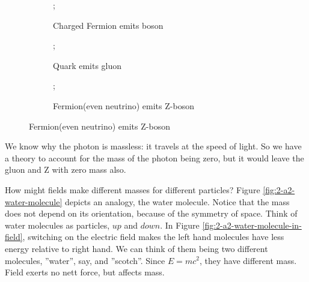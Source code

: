 \documentclass[]{article}
\begin{document}
\begin{figure}[H]
	\caption{Processes of the Standard Model (not exhaustive)}\label{fig:sm:processes}
	\begin{subfigure}[t]{0.3\textwidth}
		\caption{Charged Fermion emits boson}
		;
	\end{subfigure}
	\begin{subfigure}[t]{0.3\textwidth}
		\caption{Quark emits gluon}
		;
	\end{subfigure}
	\begin{subfigure}[t]{0.3\textwidth}
		\caption{Fermion(even neutrino) emits Z-boson}
		;
	\end{subfigure}
\end{figure} 

We know why the photon is massless: it travels at the speed of light. So we have a theory to account for the mass of the photon being zero, but it would leave the gluon and Z with zero mass also.

How might fields make different masses for different particles? Figure \ref{fig:2-a2-water-molecule} depicts an analogy, the water molecule. Notice that the mass does not depend on its orientation, because of the symmetry of space. Think of water molecules as particles, $up$ and $down$. In Figure \ref{fig:2-a2-water-molecule-in-field}, switching on the electric field makes the left hand molecules have less energy relative to right hand. We can think of them being two different molecules, ''water'', say, and ''scotch''. Since $E=mc^2$, they have different mass. Field exerts no nett force, but affects mass.  
\end{document}

